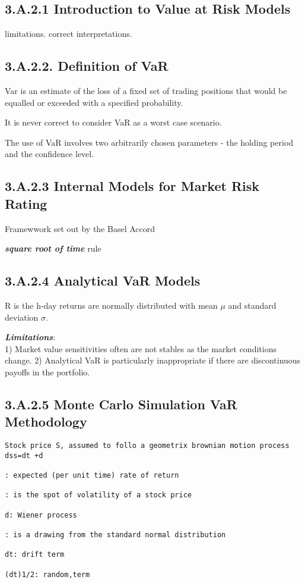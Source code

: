 \documentclass[]{report}
\begin{document}

\subsection*{3.A.2.1 Introduction to Value at Risk Models}
limitations. correct interpretations.

\subsection{3.A.2.2. Definition of VaR}
Var is an estimate of the loss of a fixed set of trading positions that would be equalled or exceeded with a specified probability. 
 

It is never correct to consider VaR as a worst case scenario.
 
The use of VaR involves two arbitrarily chosen parameters - the holding period and the confidence level.

\subsection*{3.A.2.3 Internal Models for Market Risk Rating}
Framewwork set out by the Basel Accord

\textbf{\textit{square root of time}} rule
\subsection{3.A.2.4 Analytical VaR Models}

R is the  h-day returns are normally distributed with mean $\mu$ and standard deviation $\sigma$.

\textbf{\textit{Limitations}}:\\
1) Market value sensitivities often are not stables as the market conditions change.
2) Analytical VaR is particularly inappropriate if there are discontinuous payoffs in the portfolio.

\subsection{3.A.2.5 Monte Carlo Simulation VaR Methodology}

\begin{verbatim}
Stock price S, assumed to follo a geometrix brownian motion process
dss=dt +d

: expected (per unit time) rate of return

: is the spot of volatility of a stock price

d: Wiener process 

: is a drawing from the standard normal distribution

dt: drift term

(dt)1/2: random,term
\end{verbatim}
\end{document}
